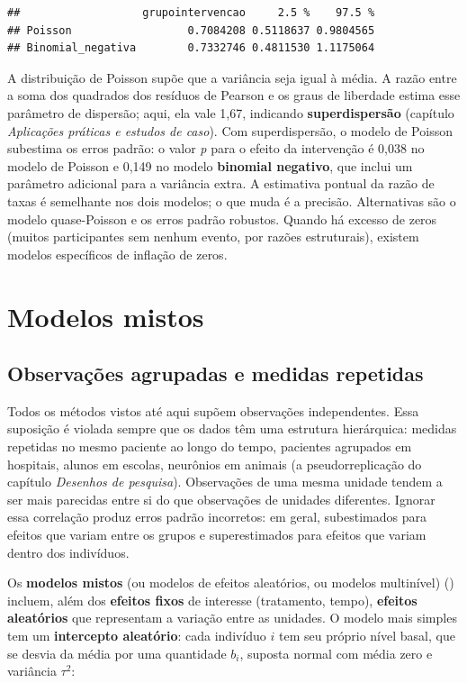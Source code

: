 \documentclass[
]{book}
\begin{document}
\begin{verbatim}
##                   grupointervencao     2.5 %    97.5 %
## Poisson                  0.7084208 0.5118637 0.9804565
## Binomial_negativa        0.7332746 0.4811530 1.1175064
\end{verbatim}

A distribuição de Poisson supõe que a variância seja igual à média. A razão entre a soma dos quadrados dos resíduos de Pearson e os graus de liberdade estima esse parâmetro de dispersão; aqui, ela vale 1,67, indicando \textbf{superdispersão} (capítulo \emph{Aplicações práticas e estudos de caso}). Com superdispersão, o modelo de Poisson subestima os erros padrão: o valor \emph{p} para o efeito da intervenção é 0,038 no modelo de Poisson e 0,149 no modelo \textbf{binomial negativo}, que inclui um parâmetro adicional para a variância extra. A estimativa pontual da razão de taxas é semelhante nos dois modelos; o que muda é a precisão. Alternativas são o modelo quase-Poisson e os erros padrão robustos. Quando há excesso de zeros (muitos participantes sem nenhum evento, por razões estruturais), existem modelos específicos de inflação de zeros.

\section{Modelos mistos}\label{modelos-mistos}

\subsection{Observações agrupadas e medidas repetidas}\label{observauxe7uxf5es-agrupadas-e-medidas-repetidas}

Todos os métodos vistos até aqui supõem observações independentes. Essa suposição é violada sempre que os dados têm uma estrutura hierárquica: medidas repetidas no mesmo paciente ao longo do tempo, pacientes agrupados em hospitais, alunos em escolas, neurônios em animais (a pseudorreplicação do capítulo \emph{Desenhos de pesquisa}). Observações de uma mesma unidade tendem a ser mais parecidas entre si do que observações de unidades diferentes. Ignorar essa correlação produz erros padrão incorretos: em geral, subestimados para efeitos que variam entre os grupos e superestimados para efeitos que variam dentro dos indivíduos.

Os \textbf{modelos mistos} (ou modelos de efeitos aleatórios, ou modelos multinível) () incluem, além dos \textbf{efeitos fixos} de interesse (tratamento, tempo), \textbf{efeitos aleatórios} que representam a variação entre as unidades. O modelo mais simples tem um \textbf{intercepto aleatório}: cada indivíduo \(i\) tem seu próprio nível basal, que se desvia da média por uma quantidade \(b_i\), suposta normal com média zero e variância \(\tau^2\):
\end{document}

